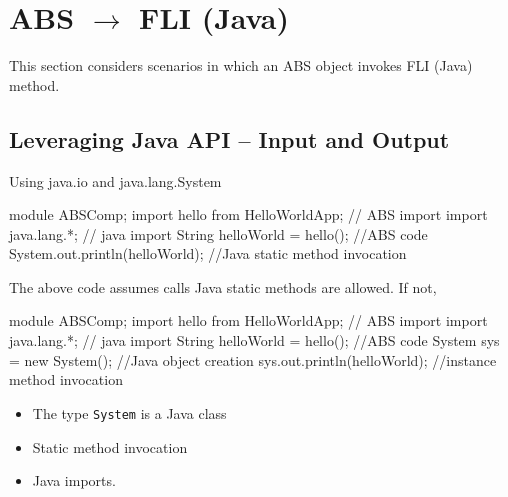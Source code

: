 \documentclass[a4paper,11pt,final]{article}
\title{\deliverableTitle}
\date{}
\begin{document}
\maketitle 

\section{ABS $\rightarrow$ FLI (Java)}
This section considers scenarios in which an ABS object invokes FLI (Java)
method.

\subsection{Leveraging Java API -- Input and Output}
Using java.io and java.lang.System
\begin{absexamplen}
module ABSComp;
import hello from HelloWorldApp; // ABS import
import java.lang.*; // java import
{
  String helloWorld = hello(); //ABS code 
  System.out.println(helloWorld); //Java static method invocation 
}
\end{absexamplen}
The above code assumes calls Java static methods are allowed. If not, 
\begin{absexamplen}
module ABSComp;
import hello from HelloWorldApp; // ABS import
import java.lang.*; // java import
{
  String helloWorld = hello(); //ABS code
  System sys = new System(); //Java object creation
  sys.out.println(helloWorld); //instance method invocation 
}
\end{absexamplen}

\begin{itemize}
  \item The type \texttt{System} is a Java class
  \item Static method invocation
  \item Java imports.
\end{itemize} 
\end{document}
